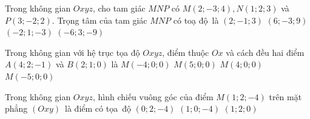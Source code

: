 \begin{ex}%
	Trong không gian $Oxyz$, cho tam giác $MNP$ có $M(2;-3;4), N(1;2;3)$ và $P(3;-2;2)$. Trọng tâm của tam giác $MNP$ có toạ  độ~là
	\choice 
		{\True  $(2;-1;3)$}
		 {$(6;-3;9)$}
		 {$(-2;1;-3)$}
		{$(-6;3;-9)$} 
\end{ex}

\begin{ex}%
	Trong không gian với  hệ trục tọa độ $Oxyz$, điểm thuộc $Ox$ và cách đều hai điểm $A(4;2;-1)$ và $B(2;1;0)$ là
	\choice 
		 {$M(-4;0;0)$}
		{$M(5;0;0)$} 
		{\True  $M(4;0;0)$}
		{$M(-5;0;0)$} 
\end{ex}

\begin{ex}%
	Trong không gian $Oxyz$, hình  chiếu vuông góc của điểm $M(1; 2;-4)$ trên mặt phẳng $(Oxy)$~là điểm có tọa~độ
		 {$(0; 2;-4)$}
		{$(1; 0;-4)$} 
		{\True $(1; 2;  0)$}
\end{ex}

